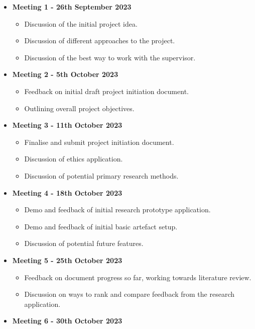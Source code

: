 \label{pm:supervisor_meeting_list}
\begin{itemize}
    \item \textbf{Meeting 1 - 26th September 2023}
    \begin{itemize}
        \item Discussion of the initial project idea.
        \item Discussion of different approaches to the project.
        \item Discussion of the best way to work with the supervisor.
    \end{itemize}
    \item \textbf{Meeting 2 - 5th October 2023}
    \begin{itemize}
        \item Feedback on initial draft project initiation document.
        \item Outlining overall project objectives.
    \end{itemize}
    \item \textbf{Meeting 3 - 11th October 2023}
    \begin{itemize}
        \item Finalise and submit project initiation document.
        \item Discussion of ethics application.
        \item Discussion of potential primary research methods.
    \end{itemize}
    \item \textbf{Meeting 4 - 18th October 2023}
    \begin{itemize}
        \item Demo and feedback of initial research prototype application.
        \item Demo and feedback of initial basic artefact setup.
        \item Discussion of potential future features.
    \end{itemize}
    \item \textbf{Meeting 5 - 25th October 2023}
    \begin{itemize}
        \item Feedback on document progress so far, working towards literature review.
        \item Discussion on ways to rank and compare feedback from the research application.
    \end{itemize}
    \item \textbf{Meeting 6 - 30th October 2023}
    \begin{itemize}

\end{itemize}
\end{itemize}
